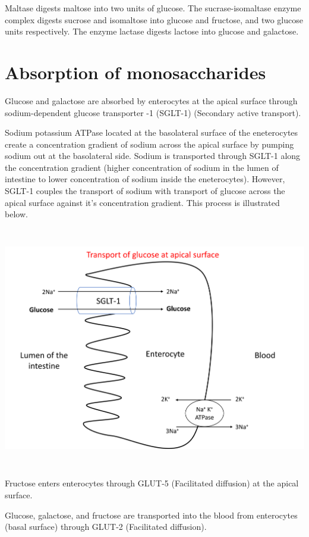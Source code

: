 \documentclass[
]{book}
\begin{document}
Maltase digests maltose into two units of glucose. The sucrase-isomaltase enzyme complex digests sucrose and isomaltose into glucose and fructose, and two glucose units respectively. The enzyme lactase digests lactose into glucose and galactose.

\section{Absorption of monosaccharides}\label{absorption-of-monosaccharides}

Glucose and galactose are absorbed by enterocytes at the apical surface through sodium-dependent glucose transporter -1 (SGLT-1) (Secondary active transport).

Sodium potassium ATPase located at the basolateral surface of the eneterocytes create a concentration gradient of sodium across the apical surface by pumping sodium out at the basolateral side. Sodium is transported through SGLT-1 along the concentration gradient (higher concentration of sodium in the lumen of intestine to lower concentration of sodium inside the eneterocytes). However, SGLT-1 couples the transport of sodium with transport of glucose across the apical surface against it's concentration gradient. This process is illustrated below.

\includegraphics[width=\textwidth,height=4.16667in]{Images/SGLT1.png}

Fructose enters enterocytes through GLUT-5 (Facilitated diffusion) at the apical surface.

Glucose, galactose, and fructose are transported into the blood from enterocytes (basal surface) through GLUT-2 (Facilitated diffusion).
\end{document}

